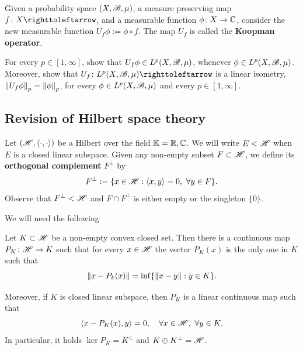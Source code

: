 Given a probability space $(X,\mathscr{B},\mu)$, a measure preserving map $f\colon X\carr$, and a measurable function $\phi\colon X\to\mathbb{C}$, consider the new measurable function $U_{f}\phi:=\phi\circ f$. The map $U_{f}$ is called the \textbf{Koopman operator}.
\begin{exercise}\label{exer:Koopman-operators-are-isometries}
  For every $p\in[1,\infty]$, show that $U_{f}\phi\in L^{p}(X,\mathscr{B},\mu)$, whenever $\phi\in L^{p}(X,\mathscr{B},\mu)$. Moreover, show that $U_{f}\colon L^{p}(X,\B,\mu)\carr$ is a linear isometry, \ie~$\left\|{U_{f}\phi}\right\|_{p}=\left\|{\phi}\right\|_{p}$, for every $\phi\in L ^{p}(X,\mathscr{B},\mu)$ and every $p\in[1,\infty]$.
\end{exercise}

\subsection{Revision of Hilbert space theory}\label{sec:revis-Hilbert-space-theory}

Let $(\mathscr{H},\langle\cdot,\cdot\rangle)$ be a Hilbert over the field $\mathbb{K}=\mathbb{R},\mathbb{C}$. We will write $E<\mathscr{H}$ when $E$ is a closed linear subspace. Given any non-empty subset $F\subset\mathscr{H}$, we define its \textbf{orthogonal complement} $F^{\perp}$ by
\begin{displaymath}
  F^{\perp}:=\{x\in\mathscr{H} : \langle x,y\rangle = 0,\ \forall y\in F\}.
\end{displaymath}
Observe that $F^{\perp}<\mathscr{H}$ and $F\cap F^{\perp}$ is either empty or the singleton $\{0\}$.

We will need the following
\begin{theorem}\label{thm:projection-convex-closed-subsets-Hilbert}
  Let $K\subset\mathscr{H}$ be a non-empty convex closed set. Then there is a continuous map $P_{K}\colon\mathscr{H}\to K$ such that for every $x\in\mathscr{H}$ the vector $P_{K}(x)$ is the only one in $K$ such that
  \begin{displaymath}
    \left\|{x-P_{k}(x)}\right\|=\inf\{\left\|{x-y}\right\| : y\in K\}.
  \end{displaymath}

  Moreover, if $K$ is closed linear subspace, then $P_{K}$ is a linear continuous map such that
  \begin{displaymath}
    \langle x-P_{K}(x), y\rangle = 0, \quad\forall x\in\mathscr{H},\ \forall y\in K.
  \end{displaymath}
  In particular, it holds $\ker P_{K}=K^{\perp}$ and $K\oplus K^{\perp}=\mathscr{H}$.
\end{theorem}


